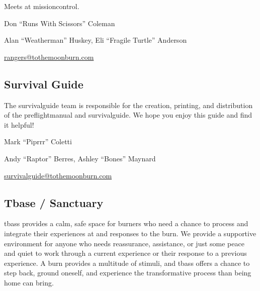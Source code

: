\begin{multicols}{2}
Meets at \gls{missioncontrol}.

\begin{description}[leftmargin=6em,noitemsep,style=nextline]
   \item[Lead:] Don ``Runs With Scissors'' Coleman
   \item[Co-leads:] Alan ``Weatherman'' Huskey, Eli ``Fragile Turtle'' Anderson 
   \item[Contact:] \url{rangers@tothemoonburn.com}
\end{description}



\subsection*{Survival Guide}
\label{sec:survivalguide}
The \gls{survivalguide} team is responsible for the creation, printing, and distribution of the \gls{preflightmanual} and \gls{survivalguide}. We hope you enjoy this guide and find it helpful!

\begin{description}[leftmargin=6em,noitemsep,style=nextline]
   \item[Lead:] Mark ``Piprrr'' Coletti
   \item[Co-leads:] Andy ``Raptor'' Berres, Ashley ``Bones'' Maynard
   \item[Contact:] \url{survivalguide@tothemoonburn.com}
\end{description}


\subsection*{Tbase / Sanctuary}

\Gls{tbass} provides a calm, safe space for burners who need a chance to process and integrate their experiences at and responses to the burn. We provide a supportive environment for anyone who needs reassurance, assistance, or just some peace and quiet to work through a current experience or their response to a previous experience. A burn provides a multitude of stimuli, and \gls{tbass}  offers a chance to step back, ground oneself, and experience the transformative process than being home can bring.


\end{multicols}
